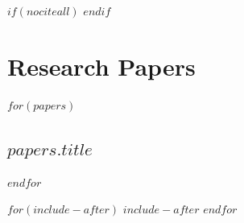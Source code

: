 \documentclass[11pt,a4paper,oneside,openright,titlepage,
  headinclude,footinclude,BCOR5mm,
  numbers=noenddot,cleardoublepage=empty,
  tablecaptionabove, dottedtoc,
  bibliography=totoc]{scrreprt}
\begin{document}
$if(nociteall)$
\nocite{*}
$endif$

\appendix
\part*{Research Papers}
$for(papers)$
\par\chapter{$papers.title$}

$endfor$
% 
% 
% 

$for(include-after)$
$include-after$
$endfor$
\end{document}
